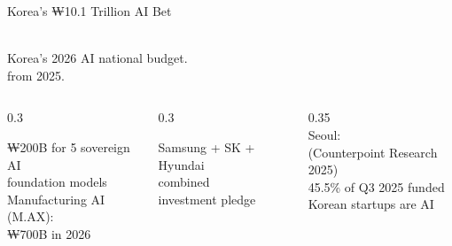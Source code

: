 \begin{frame}{Korea's ₩10.1 Trillion AI Bet}
\begin{center}
  {\fontsize{52}{58}\selectfont{}}\\[0.4em]
  {\large Korea's 2026 AI national budget.}\\[0.2em]
  {\normalsize{} from 2025.}\\[0.6em]
  \begin{columns}[t]
    \begin{column}{0.3\textwidth}
      \begin{methodbox}[Government]
        \footnotesize ₩200B for 5 sovereign AI\\
        foundation models\\[2pt]
        Manufacturing AI (M.AX):\\
        ₩700B in 2026
      \end{methodbox}
    \end{column}
    \begin{column}{0.3\textwidth}
      \begin{resultbox}[Industry]
        \footnotesize Samsung + SK + Hyundai\\
         combined\\
        investment pledge
      \end{resultbox}
    \end{column}
    \begin{column}{0.35\textwidth}
      {\footnotesize{}}\\[0.3em]
      \footnotesize Seoul: \\
      (Counterpoint Research 2025)\\[2pt]
      45.5\% of Q3 2025 funded\\
      Korean startups are AI
    \end{column}
  \end{columns}
\end{center}
\vspace{0.3em}
{\footnotesize{}}
\end{frame}

